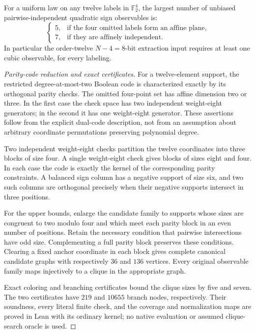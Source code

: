 \begin{proposition}\label{s21:prop:nonlinear-twelve-classification}
For a uniform law on any twelve labels in $\mathbb F_2^4$, the largest
number of unbiased pairwise-independent quadratic sign observables is:
\[
 \begin{cases}
 5,&\text{if the four omitted labels form an affine plane},\\
 7,&\text{if they are affinely independent}.
 \end{cases}
\]
In particular the order-twelve $N-4=8$-bit extraction input requires
at least one cubic observable, for every labeling.
\end{proposition}
\begin{proof}[Parity-code reduction and exact certificates]
For a twelve-element support, the restricted degree-at-most-two Boolean
code is characterized exactly by its orthogonal parity checks. The omitted
four-point set has affine dimension two or three. In the first case the
check space has two independent weight-eight generators; in the second
it has one weight-eight generator. These assertions follow from the
explicit dual-code description, not from an assumption about arbitrary
coordinate permutations preserving polynomial degree.

Two independent weight-eight checks partition the twelve coordinates
into three blocks of size four. A single weight-eight check gives blocks
of sizes eight and four. In each case the code is exactly the kernel of
the corresponding parity constraints. A balanced sign column has a
negative support of size six, and two such columns are orthogonal
precisely when their negative supports intersect in three positions.

For the upper bounds, enlarge the candidate family to supports whose
sizes are congruent to two modulo four and which meet each parity block
in an even number of positions. Retain the necessary condition that
pairwise intersections have odd size. Complementing a full parity block
preserves these conditions. Clearing a fixed anchor coordinate in each
block gives complete canonical candidate graphs with respectively
$36$ and $136$ vertices. Every original observable family maps
injectively to a clique in the appropriate graph.

Exact coloring and branching certificates bound the clique sizes by
five and seven. The two certificates have $219$ and $10655$ branch nodes,
respectively. Their soundness, every literal finite check, and the
coverage and normalization maps are proved in Lean with its ordinary
kernel; no native evaluation or assumed clique-search oracle is used.


\end{proof}
